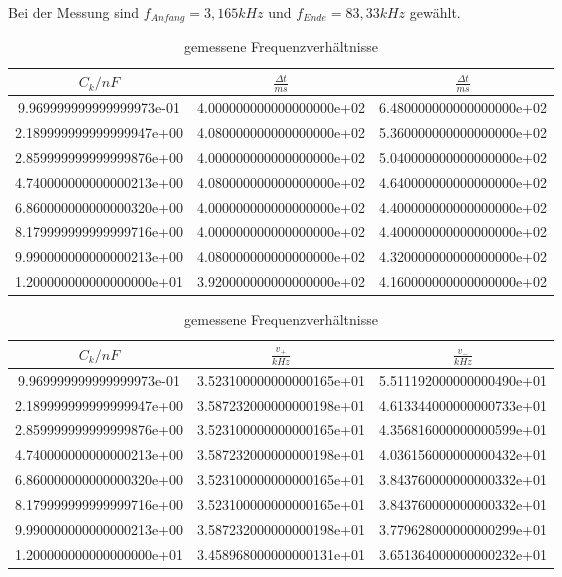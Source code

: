 Bei der Messung sind $f_{Anfang} = 3,165kHz$ und $f_{Ende} = 83,33kHz$ gewählt.

\begin{table}
  \centering
\caption{gemessene Frequenzverhältnisse}
\label{tab:sweap}
\begin{tabular}{S S S}
  \toprule
  {$C_k/nF$} & {$\frac{\Delta t}{ms}$} & {$\frac{\Delta t}{ms}$}\\
  \midrule
  9.969999999999999973e-01 & 4.000000000000000000e+02 & 6.480000000000000000e+02\\
  2.189999999999999947e+00 & 4.080000000000000000e+02 & 5.360000000000000000e+02\\
  2.859999999999999876e+00 & 4.000000000000000000e+02 & 5.040000000000000000e+02\\
  4.740000000000000213e+00 & 4.080000000000000000e+02 & 4.640000000000000000e+02\\
  6.860000000000000320e+00 & 4.000000000000000000e+02 & 4.400000000000000000e+02\\
  8.179999999999999716e+00 & 4.000000000000000000e+02 & 4.400000000000000000e+02\\
  9.990000000000000213e+00 & 4.080000000000000000e+02 & 4.320000000000000000e+02\\
  1.200000000000000000e+01 & 3.920000000000000000e+02 & 4.160000000000000000e+02\\
\bottomrule
\end{tabular}
\end{table}
\FloatBarrier

\begin{table}
  \centering
\caption{gemessene Frequenzverhältnisse}
\label{tab:sweap}
\begin{tabular}{S S S}
  \toprule
  {$C_k/nF$} & {$\frac{v_+}{kHz}$} & {$\frac{v_-}{kHz}$}\\
  \midrule
  9.969999999999999973e-01 & 3.523100000000000165e+01 & 5.511192000000000490e+01\\
  2.189999999999999947e+00 & 3.587232000000000198e+01 & 4.613344000000000733e+01\\
  2.859999999999999876e+00 & 3.523100000000000165e+01 & 4.356816000000000599e+01\\
  4.740000000000000213e+00 & 3.587232000000000198e+01 & 4.036156000000000432e+01\\
  6.860000000000000320e+00 & 3.523100000000000165e+01 & 3.843760000000000332e+01\\
  8.179999999999999716e+00 & 3.523100000000000165e+01 & 3.843760000000000332e+01\\
  9.990000000000000213e+00 & 3.587232000000000198e+01 & 3.779628000000000299e+01\\
  1.200000000000000000e+01 & 3.458968000000000131e+01 & 3.651364000000000232e+01\\

\bottomrule
\end{tabular}
\end{table}
\FloatBarrier



